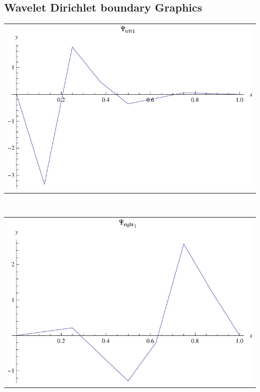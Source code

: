 \documentclass{article}
\begin{document}
\begin{landscape}
\subsection{Wavelet Dirichlet boundary Graphics}
\begin{tabular}{c}
\includegraphics[width=20.cm]{linear_wavelet_dleft_1.pdf}\end{tabular} 
 \\ 
\begin{tabular}{c}
\includegraphics[width=20.cm]{linear_wavelet_dright_1.pdf}\end{tabular} 
 \end{landscape}
\end{document}
